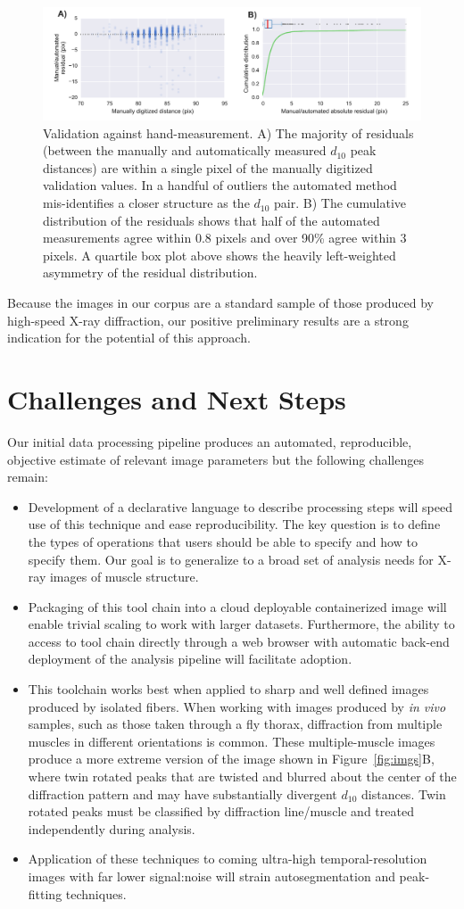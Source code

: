\documentclass{llncs}
\newcommand{\figureerror}{
\begin{figure}[tbp]
  \centering
  \includegraphics[width=\linewidth]{figures/hand_vs_auto}
  \caption{\label{fig:error}
  	Validation against hand-measurement. 
    A) The majority of residuals (between the manually and
    automatically measured $d_{10}$ peak distances) are within a
    single pixel of the manually digitized validation values. In a
    handful of outliers the automated method mis-identifies a closer
    structure as the $d_{10}$ pair. B) The cumulative distribution of
    the residuals shows that half of the automated measurements agree
    within 0.8 pixels and over 90\% agree within 3 pixels. A quartile
    box plot above shows the heavily left-weighted asymmetry of the
    residual distribution.  
    }
	\vspace{-10pt}
\end{figure}
}
\begin{document}
\figureerror

Because the images in our corpus are a standard sample of those
produced by high-speed X-ray diffraction, our positive preliminary
results are a strong indication for the potential of this approach.


\section{Challenges and Next Steps}
\label{sec:challenges}

Our initial data processing pipeline produces an automated,
reproducible, objective estimate of relevant image parameters but the
following challenges remain:

\begin{itemize}
\item Development of a declarative language to describe processing
    steps will speed use of this technique and ease reproducibility.
    The key question is to define the types of operations that users
    should be able to specify and how to specify them. Our goal is to
    generalize to a broad set of analysis needs for X-ray images of
    muscle structure.
\item Packaging of this tool chain into a cloud deployable
    containerized image will enable trivial scaling to work with
    larger datasets. Furthermore, the ability to access to tool chain
    directly through a web browser with automatic back-end deployment
    of the analysis pipeline will facilitate adoption. 
\item This toolchain works best when applied to sharp and well defined
    images produced by isolated fibers. When working with images
    produced by \textit{in vivo} samples, such as those taken through
    a fly thorax, diffraction from multiple muscles in different
    orientations is common. These multiple-muscle images produce a
    more extreme version of the image shown in Figure~\ref{fig:imgs}B,
    where twin rotated peaks that are twisted and blurred about the
    center of the diffraction pattern and may have substantially
    divergent $d_{10}$ distances. Twin rotated peaks must be classified by
    diffraction line/muscle and treated independently during analysis. 
\item Application of these techniques to coming ultra-high
    temporal-resolution images with far lower signal:noise will strain
    autosegmentation and peak-fitting techniques. 
\end{itemize}
\end{document}
